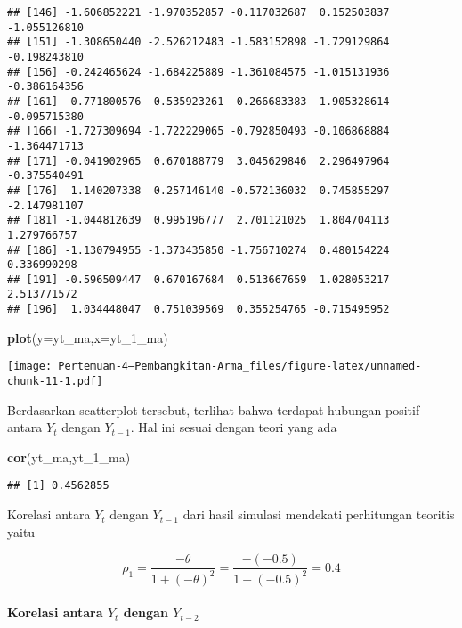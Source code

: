 \documentclass[
]{article}
\newenvironment{Shaded}{\begin{snugshade}}{\end{snugshade}}
\newcommand{\AttributeTok}[1]{\textcolor[rgb]{0.13,0.29,0.53}{#1}}
\newcommand{\FunctionTok}[1]{\textcolor[rgb]{0.13,0.29,0.53}{\textbf{#1}}}
\newcommand{\NormalTok}[1]{#1}
\begin{document}
\begin{verbatim}
## [146] -1.606852221 -1.970352857 -0.117032687  0.152503837 -1.055126810
## [151] -1.308650440 -2.526212483 -1.583152898 -1.729129864 -0.198243810
## [156] -0.242465624 -1.684225889 -1.361084575 -1.015131936 -0.386164356
## [161] -0.771800576 -0.535923261  0.266683383  1.905328614 -0.095715380
## [166] -1.727309694 -1.722229065 -0.792850493 -0.106868884 -1.364471713
## [171] -0.041902965  0.670188779  3.045629846  2.296497964 -0.375540491
## [176]  1.140207338  0.257146140 -0.572136032  0.745855297 -2.147981107
## [181] -1.044812639  0.995196777  2.701121025  1.804704113  1.279766757
## [186] -1.130794955 -1.373435850 -1.756710274  0.480154224  0.336990298
## [191] -0.596509447  0.670167684  0.513667659  1.028053217  2.513771572
## [196]  1.034448047  0.751039569  0.355254765 -0.715495952
\end{verbatim}

\begin{Shaded}
\begin{Highlighting}[]
\FunctionTok{plot}\NormalTok{(}\AttributeTok{y=}\NormalTok{yt\_ma,}\AttributeTok{x=}\NormalTok{yt\_1\_ma)}
\end{Highlighting}
\end{Shaded}

\texttt{[image: Pertemuan-4---Pembangkitan-Arma\_files/figure-latex/unnamed-chunk-11-1.pdf]}

Berdasarkan scatterplot tersebut, terlihat bahwa terdapat hubungan
positif antara \(Y_t\) dengan \(Y_{t-1}\). Hal ini sesuai dengan teori
yang ada

\begin{Shaded}
\begin{Highlighting}[]
\FunctionTok{cor}\NormalTok{(yt\_ma,yt\_1\_ma)}
\end{Highlighting}
\end{Shaded}

\begin{verbatim}
## [1] 0.4562855
\end{verbatim}

Korelasi antara \(Y_t\) dengan \(Y_{t-1}\) dari hasil simulasi mendekati
perhitungan teoritis yaitu

\[
\rho_1=\frac{-\theta}{1+(-\theta)^2}=\frac{-(-0.5)}{1+(-0.5)^2}=0.4
\]

\paragraph{\texorpdfstring{Korelasi antara \(Y_t\) dengan
\(Y_{t-2}\)}{Korelasi antara Y\_t dengan Y\_\{t-2\}}}\label{korelasi-antara-y_t-dengan-y_t-2}
\end{document}
